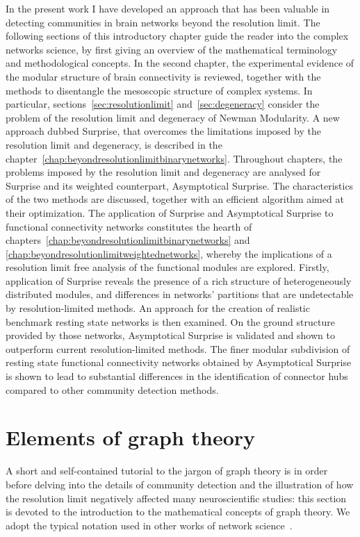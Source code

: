 In the present work I have developed an approach that has been valuable in detecting communities in brain networks beyond the resolution limit.
The following sections of this introductory chapter guide the reader into the complex networks science, by first giving an overview of the mathematical terminology and methodological concepts.
In the second chapter, the experimental evidence of the modular structure of brain connectivity is reviewed, together with the methods to disentangle the mesoscopic structure of complex systems. In particular, sections~\ref{sec:resolutionlimit} and~\ref{sec:degeneracy} consider the problem of the resolution limit and degeneracy of Newman Modularity.
A new approach dubbed Surprise, that overcomes the limitations imposed by the resolution limit and degeneracy, is described in the chapter~\ref{chap:beyondresolutionlimitbinarynetworks}.
Throughout chapters, the problems imposed by the resolution limit and degeneracy are analysed for Surprise and its weighted counterpart, Asymptotical Surprise. The characteristics of the two methods are discussed, together with an efficient algorithm aimed at their optimization.
The application of Surprise and Asymptotical Surprise to functional connectivity networks constitutes the hearth of chapters~\ref{chap:beyondresolutionlimitbinarynetworks} and \ref{chap:beyondresolutionlimitweightednetworks}, whereby the implications of a resolution limit free analysis of the functional modules are explored.
Firstly, application of Surprise reveals the presence of a rich structure of heterogeneously distributed modules, and differences in networks' partitions that are undetectable by resolution-limited methods.
An approach for the creation of realistic benchmark resting state networks is then examined.
On the ground structure provided by those networks, Asymptotical Surprise is validated and shown to outperform current resolution-limited methods.
The finer modular subdivision of resting state functional connectivity networks obtained by Asymptotical Surprise is shown to lead to substantial differences in the identification of connector hubs compared to other community detection methods.

\section{Elements of graph theory}\label{sec:elementsofgraphtheory}
A short and self-contained tutorial to the jargon of graph theory is in order before delving into the details of community detection and the illustration of how the resolution limit negatively affected many neuroscientific studies: this section is devoted to the introduction to the mathematical concepts of graph theory.
We adopt the typical notation used in other works of network science~\cite{newman2010book,estrada2011}.

